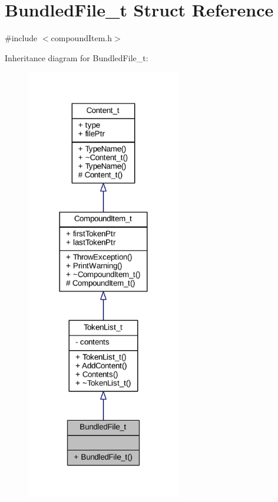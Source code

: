 \hypertarget{struct_bundled_file__t}{}\section{Bundled\+File\+\_\+t Struct Reference}
\label{struct_bundled_file__t}


{\ttfamily \#include $<$compound\+Item.\+h$>$}



Inheritance diagram for Bundled\+File\+\_\+t\+:
\nopagebreak
\begin{figure}[H]
\begin{center}
\leavevmode
\includegraphics[width=191pt]{struct_bundled_file__t__inherit__graph}
\end{center}
\end{figure}


